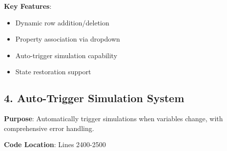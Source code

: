 \documentclass[12pt,a4paper]{article}
\begin{document}
\textbf{Key Features}:
\begin{itemize}
    \item Dynamic row addition/deletion
    \item Property association via dropdown
    \item Auto-trigger simulation capability
    \item State restoration support
\end{itemize}

\subsection{4. Auto-Trigger Simulation System}

\textbf{Purpose}: Automatically trigger simulations when variables change, with comprehensive error handling.

\textbf{Code Location}: Lines 2400-2500
\end{document}

